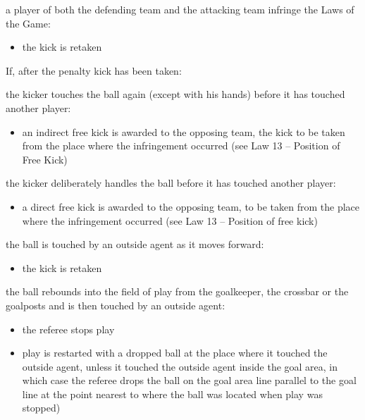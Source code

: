 {\bigskip

a player of both the defending team and the attacking team infringe the
Laws of the Game:

\begin{itemize}
\item the kick is retaken
\end{itemize}

\bigskip

If, after the penalty kick has been taken:

the kicker touches the ball again (except with his hands) before it has
touched another player:

\begin{itemize}
\item an indirect free kick is awarded to the opposing team, the kick to be
taken from the place where the infringement occurred (see Law 13 --
Position of Free Kick)
\end{itemize}

\bigskip

the kicker deliberately handles the ball before it has touched another
player:

\begin{itemize}
\item a direct free kick is awarded to the opposing team, to be taken from the
place where the infringement occurred (see Law 13 -- Position of free
kick)
\end{itemize}

\bigskip

the ball is touched by an outside agent as it moves forward:

\begin{itemize}
\item the kick is retaken
\end{itemize}

\bigskip

the ball rebounds into the field of play from the goalkeeper, the
crossbar or the goalposts and is then touched by an outside agent:

\begin{itemize}
\item the referee stops play
\item play is restarted with a dropped ball at the place where it touched the
outside agent, unless it touched the outside agent inside the goal area,
in which case the referee drops the ball on the goal area line parallel
to the goal line at the point nearest to where the ball was located
when play was stopped)
\end{itemize}
}
\color{black}
